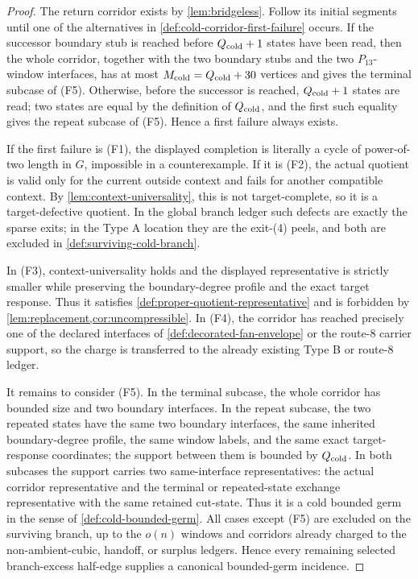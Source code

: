 \documentclass[11pt]{article}
\begin{document}
\begin{proof}
The return corridor exists by \cref{lem:bridgeless}.  Follow its initial
segments until one of the alternatives in
\cref{def:cold-corridor-first-failure} occurs.  If the successor boundary stub
is reached before \(Q_{\rm cold}+1\) states have been read, then the whole
corridor, together with the two boundary stubs and the two \(P_{13}\)-window
interfaces, has at most \(M_{\rm cold}=Q_{\rm cold}+30\) vertices and gives the
terminal subcase of (F5).  Otherwise, before the successor is reached,
\(Q_{\rm cold}+1\) states are read; two states are equal by the definition of
\(Q_{\rm cold}\), and the first such equality gives the repeat subcase of
(F5).  Hence a first failure always exists.

If the first failure is (F1), the displayed completion is literally a cycle of
power-of-two length in \(G\), impossible in a counterexample.  If it is (F2),
the actual quotient is valid only for the current outside context and fails
for another compatible context.  By \cref{lem:context-universality}, this is
not target-complete, so it is a target-defective quotient.  In the global
branch ledger such defects are exactly the sparse exits; in the Type A
location they are the exit-\textup{(4)} peels, and both are excluded in
\cref{def:surviving-cold-branch}.

In (F3), context-universality holds and the displayed representative is
strictly smaller while preserving the boundary-degree profile and the exact
target response.  Thus it satisfies
\cref{def:proper-quotient-representative} and is forbidden by
\cref{lem:replacement,cor:uncompressible}.  In (F4), the corridor has reached
precisely one of the declared interfaces of
\cref{def:decorated-fan-envelope} or the route-8 carrier support, so the
charge is transferred to the already existing Type B or route-8 ledger.

It remains to consider (F5).  In the terminal subcase, the whole corridor has
bounded size and two boundary interfaces.  In the repeat subcase, the two
repeated states have the same two boundary interfaces, the same inherited
boundary-degree profile, the same window labels, and the same exact
target-response coordinates; the support between them is bounded by
\(Q_{\rm cold}\).  In both subcases the support carries two same-interface
representatives: the actual corridor representative and the terminal or
repeated-state exchange representative with the same retained cut-state.  Thus
it is a cold bounded germ in the sense of \cref{def:cold-bounded-germ}.  All
cases except (F5) are excluded on the surviving branch, up to the \(o(n)\)
windows and corridors already charged to the non-ambient-cubic, handoff, or
surplus ledgers.  Hence every remaining selected branch-excess half-edge
supplies a canonical bounded-germ incidence.
\end{proof}
\end{document}
